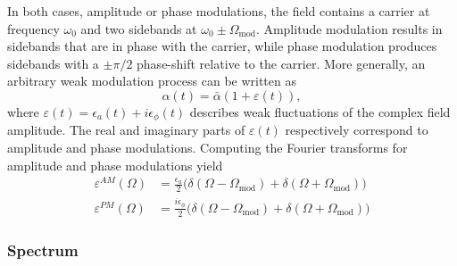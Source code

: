 In both cases, amplitude or phase modulations, the field contains a carrier at frequency $\omega_0$ and two sidebands at $\omega_0 \pm \Omega_{\mathrm{mod}}$. Amplitude modulation results in sidebands that are in phase with the carrier, while phase modulation produces sidebands with a $\pm \pi/2$ phase-shift relative to the carrier. More generally, an arbitrary weak modulation process can be written as
\begin{equation}
    \alpha(t) = \bar{\alpha}\left(1+\varepsilon(t)\right),
\end{equation}
where $\varepsilon(t) = \epsilon_a(t) + i\epsilon_{\phi}(t) $ describes weak fluctuations of the complex field amplitude. The real and imaginary parts of $\varepsilon(t)$ respectively correspond to amplitude and phase modulations. 
Computing the Fourier transforms for amplitude and phase modulations yield
\begin{equation}
  \begin{split}
    \varepsilon^{AM}(\Omega) & = \frac{\epsilon_a}{2} \Big(\delta(\Omega - \Omega_{\text{mod}}) +\delta(\Omega + \Omega_{\text{mod}}) \Big)\\
    \varepsilon^{PM}(\Omega) & = \frac{i\epsilon_\phi}{2} \Big(\delta(\Omega - \Omega_{\text{mod}}) + \delta(\Omega + \Omega_{\text{mod}})\Big)
  \end{split}
\end{equation}

\subsubsection{Spectrum }

